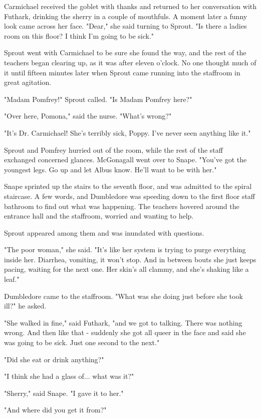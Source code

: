 Carmichael received the goblet with thanks and returned to her conversation with Futhark, drinking the sherry in a couple of mouthfuls. A moment later a funny look came across her face. "Dear," she said turning to Sprout. "Is there a ladies room on this floor? I think I'm going to be sick."

Sprout went with Carmichael to be sure she found the way, and the rest of the teachers began clearing up, as it was after eleven o'clock. No one thought much of it until fifteen minutes later when Sprout came running into the staffroom in great agitation.

"Madam Pomfrey!" Sprout called. "Is Madam Pomfrey here?"

"Over here, Pomona," said the nurse. "What's wrong?"

"It's Dr. Carmichael! She's terribly sick, Poppy. I've never seen anything like it."

Sprout and Pomfrey hurried out of the room, while the rest of the staff exchanged concerned glances. McGonagall went over to Snape. "You've got the youngest legs. Go up and let Albus know. He'll want to be with her."

Snape sprinted up the stairs to the seventh floor, and was admitted to the spiral staircase. A few words, and Dumbledore was speeding down to the first floor staff bathroom to find out what was happening. The teachers hovered around the entrance hall and the staffroom, worried and wanting to help.

Sprout appeared among them and was inundated with questions.

"The poor woman," she said. "It's like her system is trying to purge everything inside her. Diarrhea, vomiting, it won't stop. And in between bouts she just keeps pacing, waiting for the next one. Her skin's all clammy, and she's shaking like a leaf."

Dumbledore came to the staffroom. "What was she doing just before she took ill?" he asked.

"She walked in fine," said Futhark, "and we got to talking. There was nothing wrong. And then like that - suddenly she got all queer in the face and said she was going to be sick. Just one second to the next."

"Did she eat or drink anything?"

"I think she had a glass of... what was it?"

"Sherry," said Snape. "I gave it to her."

"And where did you get it from?"

